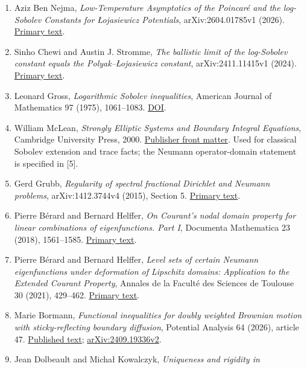 \documentclass[11pt]{article}
\begin{document}
\begin{enumerate}
\def\labelenumi{\arabic{enumi}.}
\item
  Aziz Ben Nejma, \emph{Low-Temperature Asymptotics of the Poincaré and
  the log-Sobolev Constants for \L{}ojasiewicz Potentials},
  arXiv:2604.01785v1 (2026).
  \href{https://arxiv.org/html/2604.01785v1}{Primary text}.
\item
  Sinho Chewi and Austin J. Stromme, \emph{The ballistic limit of the
  log-Sobolev constant equals the Polyak--\L{}ojasiewicz constant},
  arXiv:2411.11415v1 (2024).
  \href{https://arxiv.org/html/2411.11415v1}{Primary text}.
\item
  Leonard Gross, \emph{Logarithmic Sobolev inequalities}, American
  Journal of Mathematics 97 (1975), 1061--1083.
  \href{https://doi.org/10.2307/2373688}{DOI}.
\item
  William McLean, \emph{Strongly Elliptic Systems and Boundary Integral
  Equations}, Cambridge University Press, 2000.
  \href{https://assets.cambridge.org/97805216/63328/frontmatter/9780521663328_frontmatter.pdf}{Publisher
  front matter}. Used for classical Sobolev extension and trace facts;
  the Neumann operator-domain statement is specified in {[}5{]}.
\item
  Gerd Grubb, \emph{Regularity of spectral fractional Dirichlet and
  Neumann problems}, arXiv:1412.3744v4 (2015), Section 5.
  \href{https://arxiv.org/pdf/1412.3744v4}{Primary text}.
\item
  Pierre Bérard and Bernard Helffer, \emph{On Courant's nodal domain
  property for linear combinations of eigenfunctions. Part I}, Documenta
  Mathematica 23 (2018), 1561--1585.
  \href{https://ems.press/content/serial-article-files/26432}{Primary
  text}.
\item
  Pierre Bérard and Bernard Helffer, \emph{Level sets of certain Neumann
  eigenfunctions under deformation of Lipschitz domains: Application to
  the Extended Courant Property}, Annales de la Faculté des Sciences de
  Toulouse 30 (2021), 429--462.
  \href{https://www.numdam.org/item/AFST_2021_6_30_3_429_0.pdf}{Primary
  text}.
\item
  Marie Bormann, \emph{Functional inequalities for doubly weighted
  Brownian motion with sticky-reflecting boundary diffusion}, Potential
  Analysis 64 (2026), article 47.
  \href{https://link.springer.com/content/pdf/10.1007/s11118-026-10284-x.pdf}{Published
  text}; \href{https://arxiv.org/abs/2409.19336v2}{arXiv:2409.19336v2}.
\item
  Jean Dolbeault and Micha\l{} Kowalczyk, \emph{Uniqueness and rigidity in
}
\end{enumerate}
\end{document}
